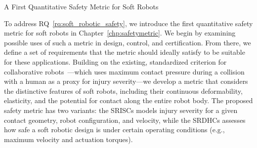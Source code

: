 \begin{contribution}\label{contrib:safety_metric}
    A First Quantitative Safety Metric for Soft Robots
\end{contribution}
To address \gls{RQ}~\ref{rq:soft_robotic_safety}, we introduce the first quantitative safety metric for soft robots in Chapter~\ref{chp:safetymetric}. We begin by examining possible uses of such a metric in design, control, and certification. From there, we define a set of requirements that the metric should ideally satisfy to be suitable for these applications.
% 
Building on the existing, standardized criterion for collaborative robots~\citep{iso2016collaborative}—which uses maximum contact pressure during a collision with a human as a proxy for injury severity—we develop a metric that considers the distinctive features of soft robots, including their continuous deformability, elasticity, and the potential for contact along the entire robot body. The proposed safety metric has two variants: the \glspl{SRISC} models injury severity for a given contact geometry, robot configuration, and velocity, while the \glspl{SRDHC} assesses how safe a soft robotic design is under certain operating conditions (e.g., maximum velocity and actuation torques). 

